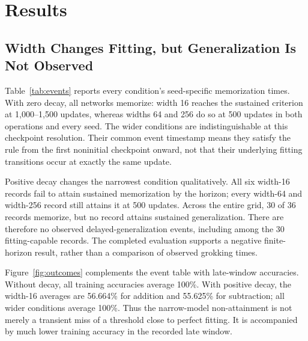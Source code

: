 \documentclass{article}
\begin{document}
\section{Results}

\subsection{Width Changes Fitting, but Generalization Is Not Observed}

Table~\ref{tab:events} reports every condition's seed-specific memorization times. With zero decay, all networks memorize: width 16 reaches the sustained criterion at 1,000--1,500 updates, whereas widths 64 and 256 do so at 500 updates in both operations and every seed. The wider conditions are indistinguishable at this checkpoint resolution. Their common event timestamp means they satisfy the rule from the first noninitial checkpoint onward, not that their underlying fitting transitions occur at exactly the same update.

Positive decay changes the narrowest condition qualitatively. All six width-16 records fail to attain sustained memorization by the horizon; every width-64 and width-256 record still attains it at 500 updates. Across the entire grid, 30 of 36 records memorize, but no record attains sustained generalization. There are therefore no observed delayed-generalization events, including among the 30 fitting-capable records. The completed evaluation supports a negative finite-horizon result, rather than a comparison of observed grokking times.

\begin{table}[t]
  \centering
  \small
  
  \caption{Sustained memorization times in updates, with generalization attainment shown separately. A dash denotes no sustained memorization by 20,000 updates, not a missing or unfinished record. The final column counts observed sustained generalization events across the three seeds. Every condition has a complete trajectory.}
  \label{tab:events}
\end{table}

Figure~\ref{fig:outcomes} complements the event table with late-window accuracies. Without decay, all training accuracies average 100\%. With positive decay, the width-16 averages are 56.664\% for addition and 55.625\% for subtraction; all wider conditions average 100\%. Thus the narrow-model non-attainment is not merely a transient miss of a threshold close to perfect fitting. It is accompanied by much lower training accuracy in the recorded late window.
\end{document}
